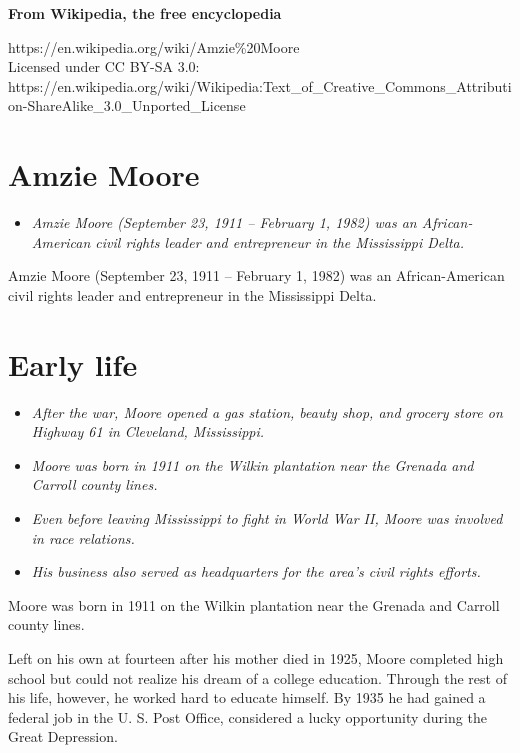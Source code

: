 \textbf{From Wikipedia, the free encyclopedia}

https://en.wikipedia.org/wiki/Amzie\%20Moore\\
Licensed under CC BY-SA 3.0:\\
https://en.wikipedia.org/wiki/Wikipedia:Text\_of\_Creative\_Commons\_Attribution-ShareAlike\_3.0\_Unported\_License

\section{Amzie Moore}\label{amzie-moore}

\begin{itemize}
\item
  \emph{Amzie Moore (September 23, 1911 -- February 1, 1982) was an
  African-American civil rights leader and entrepreneur in the
  Mississippi Delta.}
\end{itemize}

Amzie Moore (September 23, 1911 -- February 1, 1982) was an
African-American civil rights leader and entrepreneur in the Mississippi
Delta.

\section{Early life}\label{early-life}

\begin{itemize}
\item
  \emph{After the war, Moore opened a gas station, beauty shop, and
  grocery store on Highway 61 in Cleveland, Mississippi.}
\item
  \emph{Moore was born in 1911 on the Wilkin plantation near the Grenada
  and Carroll county lines.}
\item
  \emph{Even before leaving Mississippi to fight in World War II, Moore
  was involved in race relations.}
\item
  \emph{His business also served as headquarters for the area's civil
  rights efforts.}
\end{itemize}

Moore was born in 1911 on the Wilkin plantation near the Grenada and
Carroll county lines.

Left on his own at fourteen after his mother died in 1925, Moore
completed high school but could not realize his dream of a college
education. Through the rest of his life, however, he worked hard to
educate himself. By 1935 he had gained a federal job in the U. S. Post
Office, considered a lucky opportunity during the Great Depression.

